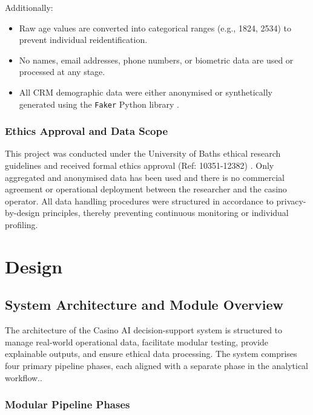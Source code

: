 \documentclass[12pt,a4paper]{report}
\begin{document}
Additionally:

\begin{itemize}
  \item Raw age values are converted into categorical ranges (e.g., 1824, 2534) to prevent individual reidentification.
  \item No names, email addresses, phone numbers, or biometric data are used or processed at any stage.
  \item All CRM demographic data were either anonymised or synthetically generated using the \texttt{Faker} Python library \citep{faker2025}.
\end{itemize}

\subsection*{Ethics Approval and Data Scope}

This project was conducted under the University of Baths ethical research guidelines and received formal ethics approval (Ref: 10351-12382) \citep{bathEthics}. Only aggregated and anonymised data has been used and there is no commercial agreement or operational deployment between the researcher and the casino operator.  All data handling procedures were structured in accordance to privacy-by-design principles, thereby preventing continuous monitoring or individual profiling.

\chapter{Design}

\section{System Architecture and Module Overview}

The architecture of the Casino AI decision-support system is structured to manage real-world operational data, facilitate modular testing, provide explainable outputs, and ensure ethical data processing.  The system comprises four primary pipeline phases, each aligned with a separate phase in the analytical workflow..

\subsection{Modular Pipeline Phases}
\end{document}
